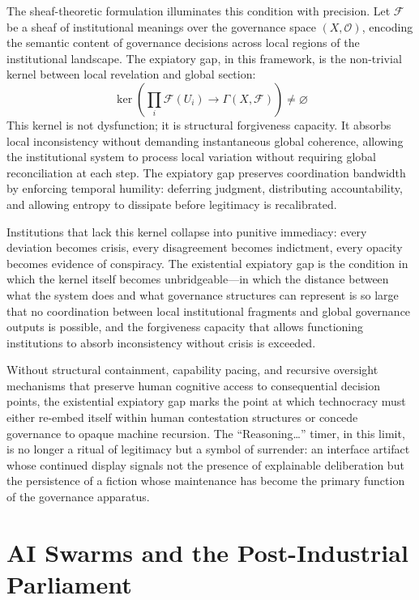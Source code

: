 \documentclass[12pt]{article}
\begin{document}
The sheaf-theoretic formulation illuminates this condition with precision. Let $\mathcal{F}$ be a sheaf of institutional meanings over the governance space $(X, \mathcal{O})$, encoding the semantic content of governance decisions across local regions of the institutional landscape. The expiatory gap, in this framework, is the non-trivial kernel between local revelation and global section:
\[
\ker\!\left(\prod_i \mathcal{F}(U_i) \to \Gamma(X, \mathcal{F})\right) \neq \varnothing
\]
This kernel is not dysfunction; it is structural forgiveness capacity. It absorbs local inconsistency without demanding instantaneous global coherence, allowing the institutional system to process local variation without requiring global reconciliation at each step. The expiatory gap preserves coordination bandwidth by enforcing temporal humility: deferring judgment, distributing accountability, and allowing entropy to dissipate before legitimacy is recalibrated.

Institutions that lack this kernel collapse into punitive immediacy: every deviation becomes crisis, every disagreement becomes indictment, every opacity becomes evidence of conspiracy. The existential expiatory gap is the condition in which the kernel itself becomes unbridgeable---in which the distance between what the system does and what governance structures can represent is so large that no coordination between local institutional fragments and global governance outputs is possible, and the forgiveness capacity that allows functioning institutions to absorb inconsistency without crisis is exceeded.

Without structural containment, capability pacing, and recursive oversight mechanisms that preserve human cognitive access to consequential decision points, the existential expiatory gap marks the point at which technocracy must either re-embed itself within human contestation structures or concede governance to opaque machine recursion. The ``Reasoning\ldots'' timer, in this limit, is no longer a ritual of legitimacy but a symbol of surrender: an interface artifact whose continued display signals not the presence of explainable deliberation but the persistence of a fiction whose maintenance has become the primary function of the governance apparatus.

\section{AI Swarms and the Post-Industrial Parliament}
\end{document}
